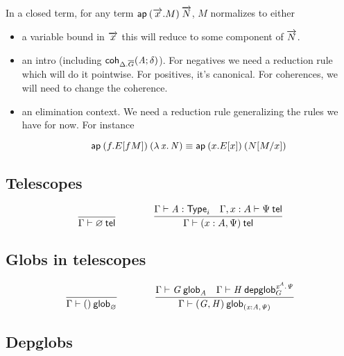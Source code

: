 In a closed term, for any term $\mathsf{ap} \: {(\overrightarrow{x}.M)} \: {\overrightarrow{N}}$, $M$ normalizes to
either
\begin{itemize}
\item a variable bound in $\overrightarrow{x}$ this will reduce to some component of
  $\overrightarrow{N}$.
\item an intro (including $\mathsf{coh}_{\Delta.\overline{G}} \mathit{(A;\delta)}$). For negatives we
  need a reduction rule which will do it pointwise. For positives, it’s
  canonical. For coherences, we will need to change the coherence.
\item an elimination context. We need a reduction rule generalizing the rules we
  have for now. For instance

\[\mathsf{ap} \: {(f.E[f M])} \: {(\mathit{\lambda\,x.\,N})} \equiv \mathsf{ap} \: {(x.E[x])} \: {(N [ M / x])}\]

\end{itemize}



\subsection{Telescopes}

\begin{small}
  \[
  \infer{\wftel{\Gamma}{\varnothing}}{}
  \qquad\qquad
  \infer{\wftel{\Gamma}{(x:A,\Psi)}}
  {\wftype{\Gamma}{A}
    & \wftel{\Gamma,x:A}{\Psi}}
  \]
\end{small}

\subsection{Globs in telescopes}

\begin{small}
  \[
  \infer{\wfglob{\Gamma}{()}{}{\varnothing}}{}
  \qquad\qquad
  \infer{\wfglob{\Gamma}{(G,H)}{}{(x:A,\Psi)}}
  {\wfglob{\Gamma}{G}{}{A}
    & \wfdepglob{\Gamma}{H}{}{x^A.\Psi}{G}}
  \]
\end{small}

\subsection{Depglobs}

\\

